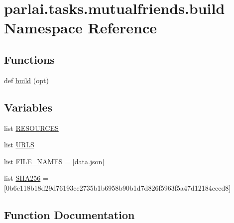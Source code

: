 \hypertarget{namespaceparlai_1_1tasks_1_1mutualfriends_1_1build}{}\section{parlai.\+tasks.\+mutualfriends.\+build Namespace Reference}
\label{namespaceparlai_1_1tasks_1_1mutualfriends_1_1build}
\subsection*{Functions}
\begin{DoxyCompactItemize}
\item 
def \hyperlink{namespaceparlai_1_1tasks_1_1mutualfriends_1_1build_ab42304948cd357bcb503986b9e4bae7a}{build} (opt)
\end{DoxyCompactItemize}
\subsection*{Variables}
\begin{DoxyCompactItemize}
\item 
list \hyperlink{namespaceparlai_1_1tasks_1_1mutualfriends_1_1build_ae9c4d890b6731608d0b84e4ca27adf4a}{R\+E\+S\+O\+U\+R\+C\+ES}
\item 
list \hyperlink{namespaceparlai_1_1tasks_1_1mutualfriends_1_1build_a56fb564b47a2286653d1738634a3b0f0}{U\+R\+LS}
\item 
list \hyperlink{namespaceparlai_1_1tasks_1_1mutualfriends_1_1build_a057cadfdc53debaf1356179faf557e30}{F\+I\+L\+E\+\_\+\+N\+A\+M\+ES} = \mbox{[}\textquotesingle{}data.\+json\textquotesingle{}\mbox{]}
\item 
list \hyperlink{namespaceparlai_1_1tasks_1_1mutualfriends_1_1build_ab9cd02d644e79e164de95191d87f9d65}{S\+H\+A256} = \mbox{[}\textquotesingle{}0b6e118b18d29d76193ce2735b1b6958b90b1d7d826f5963f5a47d12184cccd8\textquotesingle{}\mbox{]}
\end{DoxyCompactItemize}


\subsection{Function Documentation}
\mbox{\label{namespaceparlai_1_1tasks_1_1mutualfriends_1_1build_ab42304948cd357bcb503986b9e4bae7a}} 
